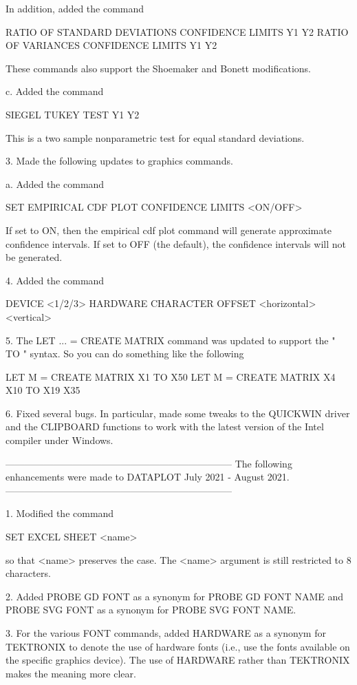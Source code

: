        In addition, added the command

          RATIO OF STANDARD DEVIATIONS CONFIDENCE LIMITS Y1 Y2
          RATIO OF VARIANCES           CONFIDENCE LIMITS Y1 Y2

       These commands also support the Shoemaker and Bonett modifications.

    c. Added the command

           SIEGEL TUKEY TEST Y1 Y2

    This is a two sample nonparametric test for equal standard deviations.

 3. Made the following updates to graphics commands.

    a. Added the command

          SET EMPIRICAL CDF PLOT CONFIDENCE LIMITS <ON/OFF>

       If set to ON, then the empirical cdf plot command will generate
       approximate confidence intervals.  If set to OFF (the default),
       the confidence intervals will not be generated.

 4. Added the command

        DEVICE <1/2/3> HARDWARE CHARACTER OFFSET  <horizontal>  <vertical>

 5. The LET ... = CREATE MATRIX command was updated to support the
     " TO " syntax.  So you can do something like the following

        LET M = CREATE MATRIX X1 TO X50
        LET M = CREATE MATRIX X4 X10 TO X19 X35

 6. Fixed several bugs.  In particular, made some tweaks to the
    QUICKWIN driver and the CLIPBOARD functions to work with the
    latest version of the Intel compiler under Windows.

-----------------------------------------------------------------------
The following enhancements were made to DATAPLOT
July 2021 - August 2021.
-----------------------------------------------------------------------

 1. Modified the command

       SET EXCEL SHEET <name>

    so that <name> preserves the case.  The <name> argument is still
    restricted to 8 characters.

 2. Added PROBE GD FONT as a synonym for PROBE GD FONT NAME and
    PROBE SVG FONT as a synonym for PROBE SVG FONT NAME.

 3. For the various FONT commands, added HARDWARE as a synonym for
    TEKTRONIX to denote the use of hardware fonts (i.e., use the
    fonts available on the specific graphics device).  The use of
    HARDWARE rather than TEKTRONIX makes the meaning more clear.

